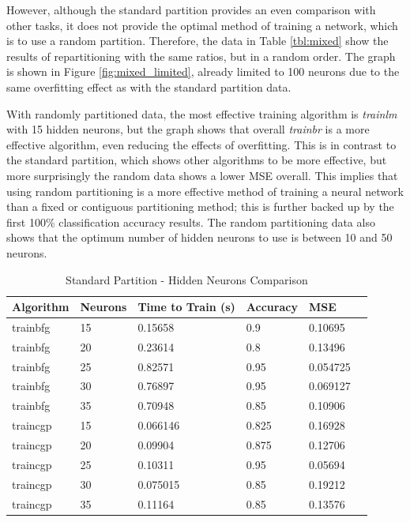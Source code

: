 \documentclass[a4paper, 10pt, conference]{ieeeconf}
\begin{document}
However, although the standard partition provides an even comparison with other tasks, it does not provide the optimal method of training a network, which is to use a random partition. Therefore, the data in Table \ref{tbl:mixed} show the results of repartitioning with the same ratios, but in a random order. The graph is shown in Figure \ref{fig:mixed_limited}, already limited to 100 neurons due to the same overfitting effect as with the standard partition data.

With randomly partitioned data, the most effective training algorithm is \textit{trainlm} with 15 hidden neurons, but the graph shows that overall \textit{trainbr} is a more effective algorithm, even reducing the effects of overfitting. This is in contrast to the standard partition, which shows other algorithms to be more effective, but more surprisingly the random data shows a lower MSE overall. This implies that using random partitioning is a more effective method of training a neural network than a fixed or contiguous partitioning method; this is further backed up by the first 100\% classification accuracy results. The random partitioning data also shows that the optimum number of hidden neurons to use is between 10 and 50 neurons.

\begin{table}
\centering
\caption{Standard Partition - Hidden Neurons Comparison}
\label{tbl:unmixed}
\begin{tabular}{llllll}
\hline
\textbf{Algorithm} & \textbf{Neurons} & \textbf{Time to Train (s)} & \textbf{Accuracy} & \textbf{MSE} \\ \hline
trainbfg & 15 & 0.15658 & 0.9 & 0.10695 \\ \hline
trainbfg & 20 & 0.23614 & 0.8 & 0.13496 \\ \hline
trainbfg & 25 & 0.82571 & 0.95 & 0.054725 \\ \hline
trainbfg & 30 & 0.76897 & 0.95 & 0.069127 \\ \hline
trainbfg & 35 & 0.70948 & 0.85 & 0.10906 \\ \hline

traincgp & 15 & 0.066146 & 0.825 & 0.16928 \\ \hline
traincgp & 20 & 0.09904 & 0.875 & 0.12706 \\ \hline
traincgp & 25 & 0.10311 & 0.95 & 0.05694 \\ \hline
traincgp & 30 & 0.075015 & 0.85 & 0.19212 \\ \hline
traincgp & 35 & 0.11164 & 0.85 & 0.13576 \\ \hline
\end{tabular}
\end{table}
\end{document}
